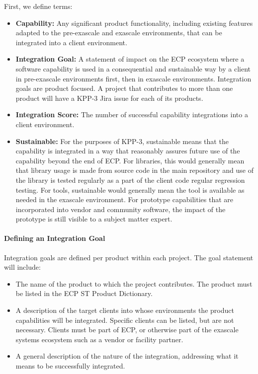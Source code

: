 First, we define terms:
\begin{itemize}
	\item \textbf{Capability:} Any significant product functionality, including existing features adapted to the pre-exascale and exascale environments, that can be integrated into a client environment.
	\item \textbf{Integration Goal:} A statement of impact on the ECP ecosystem where a software capability is used in a consequential and sustainable way by a client in pre-exascale environments first, then in exascale environments.  Integration goals are product focused.  A project that contributes to more than one product will have a KPP-3 Jira issue for each of its products.
	\item \textbf{Integration Score: }The number of successful capability integrations into a client environment.
	\item \textbf{Sustainable:} For the purposes of KPP-3, sustainable means that the capability is integrated in a way that reasonably assures future use of the capability beyond the end of ECP.  For libraries, this would generally mean that library usage is made from source code in the main repository and use of the library is tested regularly as a part of the client code regular regression testing.  For tools, sustainable would generally mean the tool is available as needed in the exascale environment.  For prototype capabilities that are incorporated into vendor and community software, the impact of the prototype is still visible to a subject matter expert.
\end{itemize}

\paragraph{Defining an Integration Goal}
Integration goals are defined per product within each project.  The goal statement will include:
\begin{itemize}
	\item The name of the product to which the project contributes.  The product must be listed in the ECP ST Product Dictionary.
	\item A description of the target clients into whose environments the product capabilities will be integrated.  Specific clients can be listed, but are not necessary.  Clients must be part of ECP, or otherwise part of the exascale systems ecosystem such as a vendor or facility partner.   
	\item A general description of the nature of the integration, addressing what it means to be successfully integrated.
\end{itemize}

